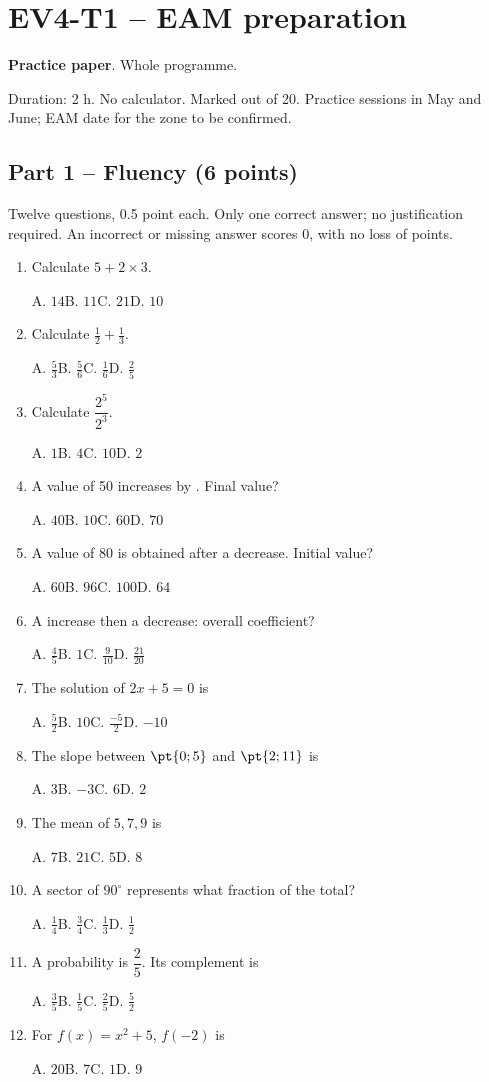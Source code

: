 \mxnewpage\section*{EV4-T1 -- EAM preparation}\label{EV4-T1}
\textbf{Practice paper}. Whole programme.\par Duration: 2 h. No calculator. Marked out of 20. Practice sessions in May and June; EAM date for the zone to be confirmed.
\subsection*{Part 1 -- Fluency (6 points)}
Twelve questions, \num{0,5} point each. Only one correct answer; no justification required. An incorrect or missing answer scores 0, with no loss of points.
\begin{enumerate}
\item Calculate $5+2\times3$.\par A. $14$\quad B. $11$\quad C. $21$\quad D. $10$
\item Calculate $\frac12+\frac13$.\par A. $\frac{5}{3}$\quad B. $\frac{5}{6}$\quad C. $\frac{1}{6}$\quad D. $\frac{2}{5}$
\item Calculate $\dfrac{2^5}{2^{3}}$.\par A. $1$\quad B. $4$\quad C. $10$\quad D. $2$
\item A value of 50 increases by . Final value?\par A. $40$\quad B. $10$\quad C. $60$\quad D. $70$
\item A value of 80 is obtained after a  decrease. Initial value?\par A. $60$\quad B. $96$\quad C. $100$\quad D. $64$
\item A  increase then a  decrease: overall coefficient?\par A. $\frac{4}{5}$\quad B. $1$\quad C. $\frac{9}{10}$\quad D. $\frac{21}{20}$
\item The solution of $2x+5=0$ is\par A. $\frac{5}{2}$\quad B. $10$\quad C. $\frac{-5}{2}$\quad D. $-10$
\item The slope between $\pt{0;5}$ and $\pt{2;11}$ is\par A. $3$\quad B. $-3$\quad C. $6$\quad D. $2$
\item The mean of $5, 7, 9$ is\par A. $7$\quad B. $21$\quad C. $5$\quad D. $8$
\item A sector of $90^\circ$ represents what fraction of the total?\par A. $\frac{1}{4}$\quad B. $\frac{3}{4}$\quad C. $\frac{1}{3}$\quad D. $\frac{1}{2}$
\item A probability is $\dfrac{2}{5}$. Its complement is\par A. $\frac{3}{5}$\quad B. $\frac{1}{5}$\quad C. $\frac{2}{5}$\quad D. $\frac{5}{2}$
\item For $f(x)=x^2+5$, $f(-2)$ is\par A. $20$\quad B. $7$\quad C. $1$\quad D. $9$
\end{enumerate}
